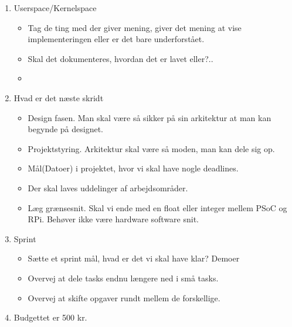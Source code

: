  
\begin{enumerate}
    \item Userspace/Kernelspace
    \begin{itemize}
        \item Tag de ting med der giver mening, giver det mening at vise implementeringen eller er det bare underforstået.
        \item Skal det dokumenteres, hvordan det er lavet eller?..
        \item 
    \end{itemize}
  
    \item Hvad er det næste skridt
    \begin{itemize}
        \item Design fasen. Man skal være så sikker på sin arkitektur at man kan begynde på designet. 
        \item Projektstyring. Arkitektur skal være så moden, man kan dele sig op. 
        \item Mål(Datoer) i projektet, hvor vi skal have nogle deadlines.
        \item Der skal laves uddelinger af arbejdsområder.
        \item Læg grænsesnit. Skal vi ende med en float eller integer mellem PSoC og RPi. Behøver ikke være hardware software snit.
    \end{itemize}
    
    \item Sprint
    \begin{itemize}
        \item Sætte et sprint mål, hvad er det vi skal have klar? Demoer
        \item Overvej at dele tasks endnu længere ned i små tasks.
        \item Overvej at skifte opgaver rundt mellem de forskellige.
    \end{itemize}
    
    \item Budgettet er 500 kr.
\end{enumerate}
 
 
